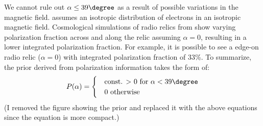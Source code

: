 We cannot rule out $\alpha \leq 39\degree$ as a result of possible
variations in the magnetic field. 
\cite{E98} assumes an isotropic distribution of electrons in an isotropic magnetic field. Cosmological
simulations of radio relics from \cite{S13} show varying polarization
fraction across and along the relic assuming $\alpha = 0$, resulting in a
lower integrated polarization fraction. For example, it is possible to see a edge-on radio relic ($\alpha = 0$) with integrated polarization fraction of 33\%. 
To summarize, the prior derived from polarization information takes the form of:
\begin{equation}
P(\alpha) = 
	\begin{cases}
	& \text{const. $>$ 0 for  }\alpha < 39 \degree \\ 
	& 0 \text{ otherwise}
	\end{cases}
\end{equation}
(I removed the figure showing the prior and replaced it with the above
equations since the equation is more compact.)
\par 



